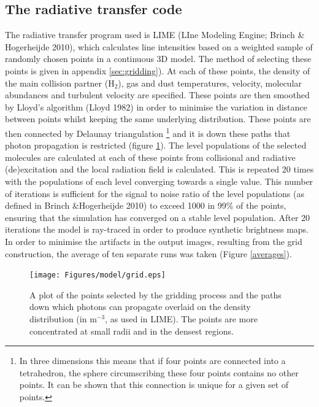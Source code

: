 \documentclass[useAMS,usenatbib]{mn2e}
\begin{document}
\subsection{The radiative transfer code} \label{subsec:radiative_transfer_code}
The radiative transfer program used is LIME (LIne Modeling Engine; Brinch \& Hogerheijde 2010), which  calculates line intensities based on a weighted sample of randomly chosen points in a continuous 3D model. The method of selecting these points is given in appendix  \ref{sec:gridding}). At each of these points, the density of the main collision partner (H$_2$), gas and dust temperatures, velocity, molecular abundances and turbulent velocity are specified. These points are then smoothed by Lloyd's algorithm (Lloyd 1982) in order to minimise the variation in distance between points whilst keeping the same underlying distribution. These points are then connected by Delaunay triangulation \footnote{In three dimensions this means that if four points are connected into a tetrahedron, the sphere circumscribing these four points contains no other points. It can be shown that this connection is unique for a given set of points.} and it is down these paths that photon propagation is restricted (figure \ref{grid}). The level populations of the selected molecules are calculated at each of these points from collisional and radiative (de)excitation and the local radiation field is calculated. This is repeated 20 times with the populations of each level converging towards a single value. This number of iterations is sufficient for the signal to noise ratio of the level populations (as defined in Brinch \&Hogerheijde 2010) to exceed 1000 in 99\% of the points, ensuring that the simulation has converged on a stable level population. After 20 iterations the model is ray-traced in order to produce synthetic brightness maps. In order to minimise the artifacts in the output images, resulting from the grid construction, the average of ten separate runs was taken (Figure \ref{averages}).


\begin{figure}
 \texttt{[image: Figures/model/grid.eps]}%
 \caption{A plot of the points selected by the gridding process and the paths down which photons can propagate overlaid on the density distribution (in m$^{-3}$, as used in LIME). The points are more concentrated at small radii and in the densest regions.}
 \label{grid}
\end{figure}
\end{document}
